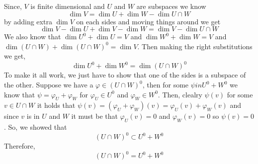 \documentclass[10pt, twocolumn]{article}
\newcommand{\annhilator}[1]{#1^{0}}
\begin{document}
\begin{q}[23]
    Since, $ V $ is finite dimensional and $ U $ and $ W $ are subspaces we know 
    $$ \dim V = \dim U + \dim W - \dim U \cap W $$
    by adding extra $ \dim V $ on each sides and moving things around we get
    $$ \dim V - \dim U + \dim V - \dim W = \dim V - \dim U \cap W $$
    We also know that $ \dim \annhilator{U} + \dim U = V $ and $ \dim \annhilator{W} + \dim W = V $ and 
    $ \dim (U \cap W) + \dim \annhilator{(U \cap W)} = \dim V $. 
    Then making the right substitutions we get, 
    $$ \dim \annhilator{U} + \dim \annhilator{W} = \dim \annhilator{(U \cap W)} $$
    To make it all work, we just have to show that one of the sides is a subspace of the other. 
    Suppose we have a $ \varphi \in (U \cap W)^0 $, then for some $ \psi in U^0 + W^0 $ we know that $ \psi = \varphi_U + \varphi_W $ for $ \varphi_U \in \annhilator{U}  $ and $ \varphi_W \in \annhilator{W} $. 
    Then, clealry $ \psi(v) $ for some $ v\in U \cap W $ it holds that $ \psi(v) = (\varphi_U + \varphi_W)(v) = \varphi_U(v) + \varphi_W(v) $ and since $ v $ is in $ U $ and $ W $ it must be that $ \varphi_U(v) = 0 $ and $ \varphi_W(v) = 0 $ so $ \psi(v) = 0 $. 
    So, we showed that 
    $$ (U \cap W)^0  \subset U^0 + W^0 $$
    Therefore, 
    $$ (U \cap W)^0  = U^0 + W^0 $$
\end{q}
\end{document}
